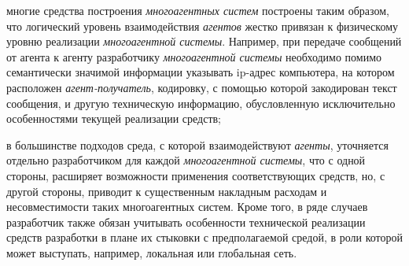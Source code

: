 \begin{textitemize}
\item многие средства построения \textit{многоагентных систем} построены таким образом, что логический уровень взаимодействия \textit{агентов} жестко привязан к физическому уровню реализации \textit{многоагентной системы}. Например, при передаче сообщений от агента к агенту разработчику \textit{многоагентной системы} необходимо помимо семантически значимой информации указывать ip-адрес компьютера, на котором расположен \textit{агент-получатель}, кодировку, с помощью которой закодирован текст сообщения, и другую техническую информацию, обусловленную исключительно особенностями текущей реализации средств;
\item в большинстве подходов среда, с которой взаимодействуют \textit{агенты}, уточняется отдельно разработчиком для каждой \textit{многоагентной системы}, что с одной стороны, расширяет возможности применения соответствующих средств, но, с другой стороны, приводит к существенным накладным расходам и несовместимости таких многоагентных систем. Кроме того, в ряде случаев разработчик также обязан учитывать особенности технической реализации средств разработки в плане их стыковки с предполагаемой средой, в роли которой может выступать, например, локальная или глобальная сеть.
\end{textitemize}

